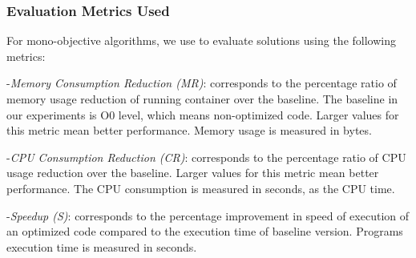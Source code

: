\subsubsection{Evaluation Metrics Used}

For mono-objective algorithms, we use to evaluate solutions using the following metrics:

-\textit{Memory Consumption Reduction (MR)}: corresponds to the percentage ratio of memory usage reduction of running container over the baseline. The baseline in our experiments is O0 level, which means non-optimized code. Larger values for this metric mean better performance. Memory usage is measured in bytes.

-\textit{CPU Consumption Reduction (CR)}: corresponds to the percentage ratio of CPU usage reduction over the baseline. Larger values for this metric mean better performance. The CPU consumption is measured in seconds, as the CPU time.

-\textit{Speedup (S)}: corresponds to the percentage improvement in speed of execution of an optimized code compared to the execution time of baseline version. Programs execution time is measured in seconds.




